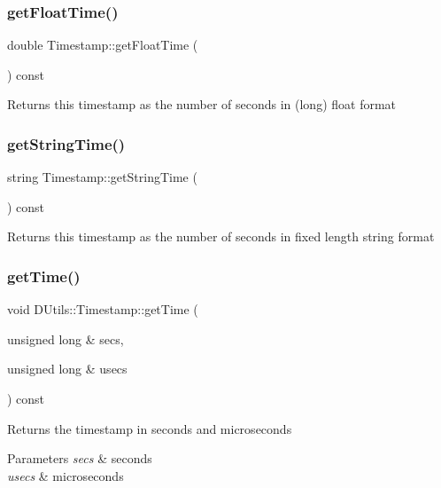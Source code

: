 \subsubsection{\texorpdfstring{get\+Float\+Time()}{getFloatTime()}}
{\footnotesize\ttfamily double Timestamp\+::get\+Float\+Time (\begin{DoxyParamCaption}{ }\end{DoxyParamCaption}) const}

Returns this timestamp as the number of seconds in (long) float format \mbox{\label{class_d_utils_1_1_timestamp_af1db3a964b6a7b88e73f7bd3110efd79}} 
\subsubsection{\texorpdfstring{get\+String\+Time()}{getStringTime()}}
{\footnotesize\ttfamily string Timestamp\+::get\+String\+Time (\begin{DoxyParamCaption}{ }\end{DoxyParamCaption}) const}

Returns this timestamp as the number of seconds in fixed length string format \mbox{\label{class_d_utils_1_1_timestamp_a15e5c1a751a3faef596437a69d4c3d88}} 
\subsubsection{\texorpdfstring{get\+Time()}{getTime()}}
{\footnotesize\ttfamily void D\+Utils\+::\+Timestamp\+::get\+Time (\begin{DoxyParamCaption}\item[{unsigned long \&}]{secs,  }\item[{unsigned long \&}]{usecs }\end{DoxyParamCaption}) const\hspace{0.3cm}{\ttfamily [inline]}}

Returns the timestamp in seconds and microseconds 
\begin{DoxyParams}{Parameters}
{\em secs} & seconds \\
\hline
{\em usecs} & microseconds \\
\hline
\end{DoxyParams}
\mbox{\label{class_d_utils_1_1_timestamp_a5777e11b3f04827e2c310c0ab147e5bf}} 
